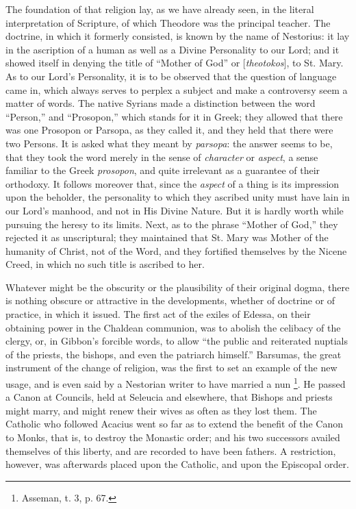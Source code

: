 The foundation of that religion lay, as we have already seen, in
the literal interpretation of Scripture, of which Theodore was the
principal teacher. The doctrine, in which it formerly consisted, is
known by the name of Nestorius: it lay in the ascription of a human as
well as a Divine Personality to our Lord; and it showed itself in
denying the title of ``Mother of God'' or [\emph{theotokos}],
to St. Mary. As to our Lord's Personality, it is to be observed that
the question of language came in, which always serves to perplex a
subject and make a controversy seem a matter of words. The native
Syrians made a distinction between the word ``Person,'' and
``Prosopon,'' which stands for it in Greek; they allowed that
there was one Prosopon or Parsopa, as they called it, and they held
that there were two Persons. It is asked what they meant by \emph{parsopa}:
the answer seems to be, that they took the word merely in the sense of
\emph{character} or \emph{aspect}, a sense familiar to the Greek \emph{prosopon},
and quite irrelevant as a guarantee of their orthodoxy. It follows
moreover that, since the \emph{aspect} of a thing is its impression
upon the beholder, the personality to which they ascribed unity must
have lain in our Lord's manhood, and not in His Divine Nature. But it
is hardly worth while pursuing the heresy to its limits. Next, as to
the phrase ``Mother of God,'' they rejected it as
unscriptural; they maintained that St. Mary was Mother of the humanity
of Christ, not of the Word, and they fortified themselves by the
Nicene Creed, in which no such title is ascribed to her.

Whatever might be the obscurity or the plausibility of their
original dogma, there is nothing obscure or attractive in the
developments, whether of doctrine or of practice, in which it issued.
The first act of the exiles of Edessa, on their obtaining power in the
Chaldean communion, was to abolish the celibacy of the clergy, or, in
Gibbon's forcible words, to allow ``the public and reiterated
nuptials of the priests, the bishops, and even the patriarch
himself.'' Barsumas, the great instrument of the change of
religion, was the first to set an example of the new usage, and is
even said by a Nestorian writer to have married a nun \footnote{Asseman, t. 3, p. 67.}. He passed a
Canon at Councils, held at Seleucia and elsewhere, that Bishops and
priests might marry, and might renew their wives as often as they lost
them. The Catholic who followed Acacius went so far as to extend the
benefit of the Canon to Monks, that is, to destroy the Monastic order;
and his two successors availed themselves of this liberty, and are
recorded to have been fathers. A restriction, however, was afterwards
placed upon the Catholic, and upon the Episcopal order.


